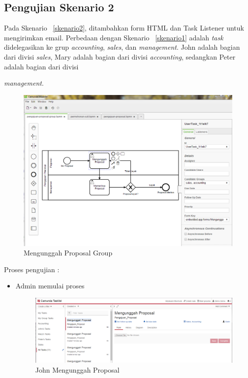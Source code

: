 		
		
\subsection{Pengujian Skenario 2}
\label{ujiskenario2}
Pada Skenario ~\ref{skenario2}, ditambahkan form HTML dan Task Listener untuk mengirimkan email. Perbedaan dengan Skenario ~\ref{skenario1} adalah \textit{task} didelegasikan ke grup \textit{accounting}, \textit{sales}, dan \textit{management}. John adalah bagian dari divisi \textit{sales}, Mary adalah bagian dari divisi \textit{accounting}, sedangkan Peter adalah bagian dari divisi {\textit{management}.
		\begin{figure}[H]
			\centering
			\includegraphics[scale=0.5]{Gambar/Bab-5/bpmn2}
			\caption{Mengunggah Proposal Group} 
			\label{fig:mengunggah proposal Group}
		\end{figure}
		
Proses pengujian :
\begin{itemize}
	\item Admin memulai proses
		\begin{figure}[H]
			\centering
			\includegraphics[scale=0.4]{Gambar/Bab-5/uji2-1}
			\caption{John Mengunggah Proposal} 
			\label{fig:johnUnggahProposal}
		\end{figure}


\end{itemize}}
